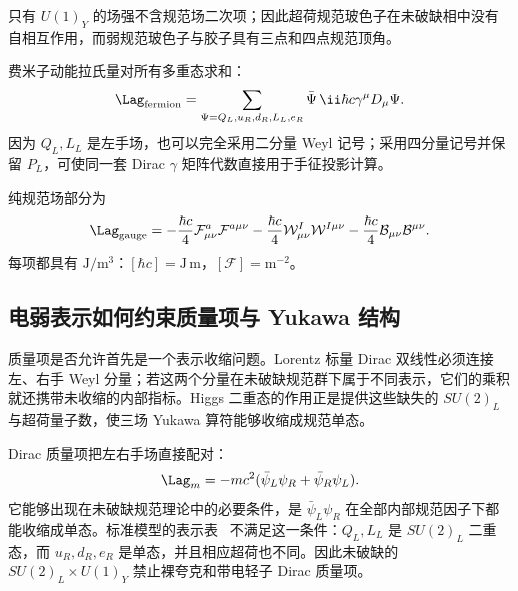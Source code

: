 只有 $U(1)_Y$ 的场强不含规范场二次项；因此超荷规范玻色子在未破缺相中没有自相互作用，而弱规范玻色子与胶子具有三点和四点规范顶角。

费米子动能拉氏量对所有多重态求和：
\begin{equation}
 \Lag_{\rm fermion}
 =\sum_{\Psi=Q_L,u_R,d_R,L_L,e_R}
 \bar\Psi\,\ii\hbar c\gamma^\mu D_\mu\Psi.
 \label{eq:sm-fermion-kinetic-dp11}
\end{equation}
因为 $Q_L,L_L$ 是左手场，也可以完全采用二分量 Weyl 记号；采用四分量记号并保留 $P_L$，可使同一套 Dirac $\gamma$ 矩阵代数直接用于手征投影计算。

纯规范场部分为
\begin{equation}
 {
 \Lag_{\rm gauge}
 =-\frac{\hbar c}{4}\mathcal F_{\mu\nu}^a\mathcal F^{a\mu\nu}
 -\frac{\hbar c}{4}\mathcal W_{\mu\nu}^I\mathcal W^{I\mu\nu}
 -\frac{\hbar c}{4}\mathcal B_{\mu\nu}\mathcal B^{\mu\nu}.}
 \label{eq:sm-gauge-lagrangian-dp11}
\end{equation}
每项都具有 $\mathrm{J/m^3}$：$[\hbar c]=\mathrm{J\,m}$，$[\mathcal F]=\mathrm{m^{-2}}$。



\subsection{电弱表示如何约束质量项与 Yukawa 结构}

质量项是否允许首先是一个表示收缩问题。Lorentz 标量 Dirac 双线性必须连接左、右手 Weyl 分量；若这两个分量在未破缺规范群下属于不同表示，它们的乘积就还携带未收缩的内部指标。Higgs 二重态的作用正是提供这些缺失的 $SU(2)_L$ 与超荷量子数，使三场 Yukawa 算符能够收缩成规范单态。

Dirac 质量项把左右手场直接配对：
\begin{equation}
 \Lag_m=-mc^2(\bar\psi_L\psi_R+\bar\psi_R\psi_L).
 \label{eq:dirac-mass-chiral-mixing-dp11}
\end{equation}
它能够出现在未破缺规范理论中的必要条件，是 $\bar\psi_L\psi_R$ 在全部内部规范因子下都能收缩成单态。标准模型的表示表~ 不满足这一条件：$Q_L,L_L$ 是 $SU(2)_L$ 二重态，而 $u_R,d_R,e_R$ 是单态，并且相应超荷也不同。因此未破缺的 $SU(2)_L\times U(1)_Y$ 禁止裸夸克和带电轻子 Dirac 质量项。

